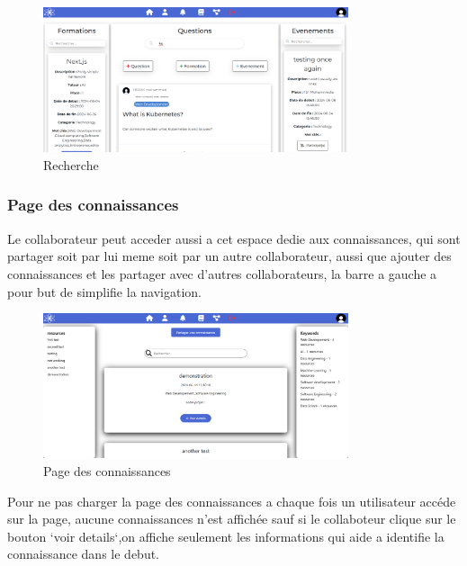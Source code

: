 \documentclass{article}
\begin{document}
                \begin{figure}[h!]
                    \centering
                    \includegraphics[width=0.8\textwidth]{assets/webSite/search.png}
                    \caption{Recherche}
                \end{figure}
                \FloatBarrier 
            \subsubsection{Page des connaissances}
                Le collaborateur peut acceder aussi a cet espace dedie aux connaissances, qui sont partager soit par lui meme soit par un autre collaborateur, aussi que ajouter des connaissances et les partager avec d'autres collaborateurs, la barre a gauche a pour but de simplifie la navigation.
                \begin{figure}[h!]
                    \centering
                    \includegraphics[width=0.8\textwidth]{assets/webSite/base-de-connaissance.png}
                    \caption{Page des connaissances}
                \end{figure}
                \FloatBarrier
                Pour ne pas charger la page des connaissances a chaque fois un utilisateur accéde sur la page, aucune connaissances n'est affichée sauf si le collaboteur clique sur  le bouton `voir details`,on affiche seulement les informations qui aide a identifie la connaissance  dans le debut.
\end{document}
